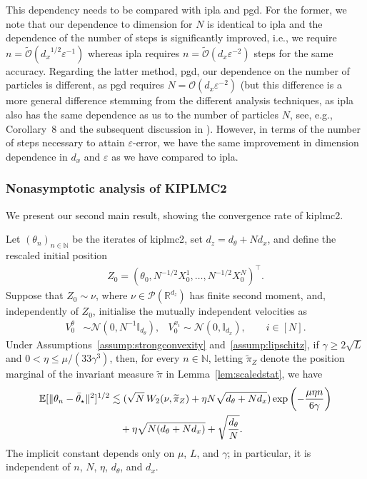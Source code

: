 \begin{remark}\label{rem:kiplmc1_complexity} This dependency needs to be compared with \gls*{ipla} and \gls*{pgd}. For the former, we note that our dependence to dimension for $N$ is identical to \gls*{ipla} and the dependence of the number of steps is significantly improved, i.e., we require $n = \widetilde{\mathcal{O}}({d_x}^{1/2} \varepsilon^{-1})$ whereas \gls*{ipla} requires $n = \widetilde{\mathcal{O}}({d_x} \varepsilon^{-2})$ steps for the same accuracy. Regarding the latter method, \gls*{pgd}, our dependence on the number of particles is different, as \gls*{pgd} requires $N = \mathcal{O}(d_x \varepsilon^{-2})$ (but this difference is a more general difference stemming from the different analysis techniques, as \gls*{ipla} also has the same dependence as us to the number of particles $N$, see, e.g., Corollary~8 and the subsequent discussion in \citep{caprio2024error}). However, in terms of the number of steps necessary to attain $\varepsilon$-error, we have the same improvement in dimension dependence in $d_x$ and $\varepsilon$ as we have compared to \gls*{ipla}.
\end{remark}

\subsubsection{Nonasymptotic analysis of KIPLMC2}
We present our second main result, showing the convergence rate of \gls*{kiplmc2}.

\begin{theorem}\label{thm:KIPLMC2}

Let $(\theta_n)_{n\in\mathbb{N}}$ be the iterates of \gls*{kiplmc2}, set $d_z=d_\theta+Nd_x$, and define the rescaled initial position
\begin{align*}
Z_0=(\theta_0,N^{-1/2}X_0^1,\ldots,N^{-1/2}X_0^N)^\intercal.
\end{align*}
Suppose that $Z_0\sim\nu$, where $\nu\in\mathcal{P}(\mathbb{R}^{d_z})$ has finite second moment, and, independently of $Z_0$, initialise the mutually independent velocities as
\begin{align*}
V_0^\theta&\sim\mathcal{N}(0,N^{-1}\mathbb{I}_{d_\theta}), &
V_0^{x_i}\sim\mathcal{N}(0,\mathbb{I}_{d_x}),\qquad i\in[N].
\end{align*}
Under Assumptions~\ref{assump:strongconvexity} and~\ref{assump:lipschitz}, if $\gamma\geq2\sqrt{L}$ and $0<\eta\leq\mu/(33\gamma^3)$, then, for every $n\in\mathbb{N}$,
letting $\widetilde\pi_Z$ denote the position marginal of the invariant measure
$\widetilde\pi$ in Lemma~\ref{lem:scaledstat}, we have
\begin{align*}
{\mathbb E}[\|\theta_n-\bar{\theta}_\star\|^2]^{1/2}
&\lesssim (\sqrt N\,W_2(\nu,\widetilde\pi_Z) +\eta N\sqrt{d_\theta+Nd_x})
\exp\left(-\frac{\mu\eta n}{6\gamma}\right)\\
&\quad+\eta\sqrt{N(d_\theta+Nd_x)}
+\sqrt{\frac{d_\theta}{N}}.
\end{align*}
The implicit constant depends only on $\mu$, $L$, and $\gamma$; in particular,
it is independent of $n$, $N$, $\eta$, $d_\theta$, and $d_x$.
\end{theorem}

